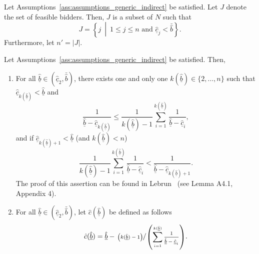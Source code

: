 \begin{define}
\label{def:feasible_bidders_indirect}
Let Assumptions~\ref{ass:assumptions_generic_indirect} be satisfied. Let $J$ denote the set of feasible bidders. Then, $J$ is a subset of $N$ such that
\begin{equation*}
  J = \left\{j \:\middle\vert\: 1\leq j\leq n \textrm{ and } \underline{\hat{c}}_j < \bar{\hat{b}}\right\}.
\end{equation*}
Furthermore, let $n' = |J|$.
\end{define}

\begin{define}
\label{def:lower_bound_bids_indirect}
Let Assumptions~\ref{ass:assumptions_generic_indirect} be satisfied. Then,
\begin{enumerate}
  \item For all $\underline{\hat{b}}\in (\underline{\hat{c}}_2, \bar{\hat{b}})$, there exists one and only one $k(\underline{\hat{b}})\in \{2,\dotsc,n\}$ such that $\underline{\hat{c}}_{k(\underline{\hat{b}})} < \underline{\hat{b}}$ and
  \begin{equation*}
    \frac{1}{\underline{\hat{b}} - \underline{\hat{c}}_{k(\underline{\hat{b}})}}\leq \frac{1}{k(\underline{\hat{b}}) - 1}\sum_{i=1}^{k(\underline{\hat{b}})}\frac{1}{\underline{\hat{b}} - \underline{\hat{c}}_i},
  \end{equation*}
  and if $\underline{\hat{c}}_{k(\underline{\hat{b}})+1} < \underline{\hat{b}}$ (and $k(\underline{\hat{b}}) < n$)
  \begin{equation*}
    \frac{1}{k(\underline{\hat{b}}) - 1}\sum_{i=1}^{k(\underline{\hat{b}})}\frac{1}{\underline{\hat{b}} - \underline{\hat{c}}_i} < \frac{1}{\underline{\hat{b}} - \underline{\hat{c}}_{k(\underline{\hat{b}})+1}}.
  \end{equation*}
  The proof of this assertion can be found in Lebrun~\cite{Lebrun2004} (see Lemma A4.1, Appendix 4).
  \item For all $\underline{\hat{b}}\in (\underline{\hat{c}}_2, \bar{\hat{b}})$, let $\hat{c}(\underline{\hat{b}})$ be defined as follows
  \begin{equation}
  \label{eq:lower_bound_bids_cost_indirect}
    \hat{c}(\underline{\hat{b}}) = \underline{\hat{b}} - \sfrac{\left(k(\underline{\hat{b}})-1\right)}{\left(\sum_{i=1}^{k(\underline{\hat{b}})} \frac{1}{\underline{\hat{b}} - \underline{\hat{c}}_i}\right)}.
  \end{equation}
\end{enumerate}
\end{define}
